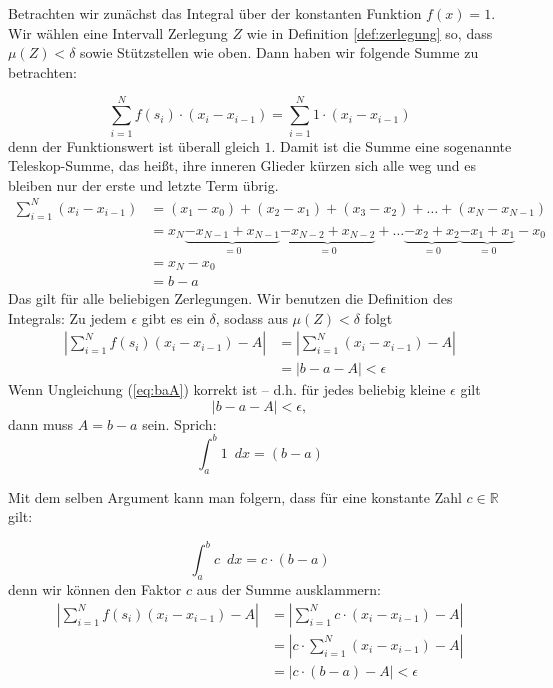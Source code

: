 Betrachten wir zunächst das Integral über der konstanten Funktion $f(x)=1$. Wir wählen eine Intervall Zerlegung $Z$ wie in Definition \ref{def:zerlegung} so, dass $\mu(Z)<\delta$ sowie Stützstellen wie oben. Dann haben wir folgende Summe zu betrachten:

\begin{equation}
\sum_{i=1}^{N} f(s_i)\cdot (x_{i}-x_{i-1}) = \sum_{i=1}^{N} 1\cdot (x_{i}-x_{i-1})
\end{equation}
denn der Funktionswert ist überall gleich $1$. Damit ist die Summe eine sogenannte Teleskop-Summe, das heißt, ihre inneren Glieder kürzen sich alle weg und es bleiben nur der erste und letzte Term übrig.
\begin{equation}
\begin{split}
\sum_{i=1}^{N} (x_{i}-x_{i-1}) &=(x_1-x_0)+(x_2-x_1)+(x_3-x_2)+\dots +(x_N-x_{N-1}) \\
&= x_N\underbrace{-x_{N-1}+x_{N-1}}_{=0} \underbrace{-x_{N-2}+x_{N-2}}_{=0}+ \dots \underbrace{-x_2+x_2}_{=0} \underbrace{-x_1+x_1}_{=0}-x_0 \\
&= x_N-x_0\\
&=b-a
\end{split}
\end{equation}
Das gilt für alle beliebigen Zerlegungen. Wir benutzen die Definition des Integrals: Zu jedem $\epsilon$ gibt es ein $\delta$, sodass aus $\mu(Z)<\delta$ folgt
\begin{equation}\label{eq:baA}
\begin{split}
\left| \sum_{i=1}^{N} f(s_i)(x_{i}-x_{i-1}) -A \right| &= \left| \sum_{i=1}^{N} (x_{i}-x_{i-1}) -A \right| \\ 
&=\left| b-a - A \right| < \epsilon
\end{split}
\end{equation}
Wenn Ungleichung (\ref{eq:baA}) korrekt ist -- d.h. für jedes beliebig kleine $\epsilon$ gilt 
\begin{equation}
|b-a-A|<\epsilon,
\end{equation}
dann muss $A=b-a$ sein. Sprich:
\begin{equation}
\int_a^b 1 \enspace dx = (b-a)
\end{equation}

Mit dem selben Argument kann man folgern, dass für eine konstante Zahl $c\in \mathbb{R}$ gilt:

\begin{equation}
\int_a^b c \enspace dx = c\cdot(b-a)
\end{equation}
denn wir können den Faktor $c$ aus der Summe ausklammern:
\begin{equation}
\begin{split}
\left| \sum_{i=1}^{N} f(s_i)(x_{i}-x_{i-1}) -A \right| &= \left| \sum_{i=1}^{N} c\cdot (x_{i}-x_{i-1}) -A \right| \\ 
&=\left| c\cdot \sum_{i=1}^{N} (x_{i}-x_{i-1}) -A \right|\\
&=\left| c\cdot (b-a) -A \right| < \epsilon
\end{split}
\end{equation}

